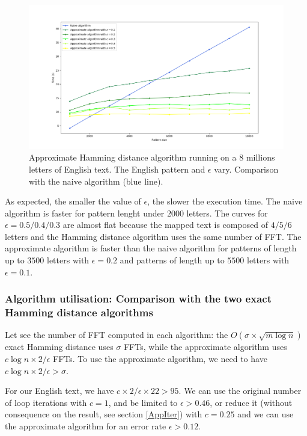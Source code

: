 \documentclass[preprint,12pt]{elsarticle}
\begin{document}
\begin{figure}[h]
\includegraphics[scale=0.45]{./figures/appHDTempsError.png}
\caption{Approximate Hamming distance algorithm running on a $8$ millions letters of English text.
The English pattern and $\epsilon$ vary.
Comparison with the naive algorithm (blue line).}
\label{AppHDTempsErr}
\end{figure}

As expected, the smaller the value of $\epsilon$, the slower the execution time.
The naive algorithm is faster for pattern lenght under $2000$ letters.
The curves for $\epsilon = 0.5 / 0.4 / 0.3$ are almost flat
because the mapped text is composed of $4 / 5 / 6$ letters
and the Hamming distance algorithm uses the same number of FFT.
The approximate algorithm is faster than the naive algorithm
for patterns of length up to $3500$ letters with $\epsilon = 0.2$
and patterns of length up to $5500$ letters with $\epsilon = 0.1$.



\subsubsection*{Algorithm utilisation: Comparison with the two exact Hamming distance algorithms}


Let see the number of FFT computed in each algorithm:
the $O(\sigma \times \sqrt{m \log n})$ exact Hamming distance uses $\sigma$ FFTs,
while the approximate algorithm uses $c \log n \times 2/\epsilon$ FFTs.
To use the approximate algorithm, we need to have $c \log n \times 2/\epsilon > \sigma$. 

For our English text, we have $c \times 2/\epsilon \times 22 > 95$.
We can use the original number of loop iterations with $c = 1$,
and be limited to $\epsilon > 0.46$,
or reduce it (without consequence on the result, see section \ref{AppIter})
with $c = 0.25$ and we can use the approximate algorithm for an error rate $\epsilon > 0.12$.
\end{document}
